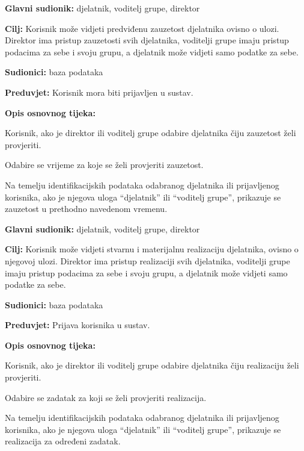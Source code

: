 			\begin{packed_item}
				\item \textbf{Glavni sudionik: } djelatnik, voditelj grupe, direktor
				\item  \textbf{Cilj:} Korisnik može vidjeti predviđenu zauzetost djelatnika ovisno o ulozi. Direktor ima pristup zauzetosti svih djelatnika, voditelji grupe imaju pristup podacima za sebe i svoju grupu, a djelatnik može vidjeti samo podatke za sebe.
				\item  \textbf{Sudionici:} baza podataka
				\item  \textbf{Preduvjet:} Korisnik mora biti prijavljen u sustav.
				\item  \textbf{Opis osnovnog tijeka:}
				\item[] \begin{packed_enum}
					\item Korisnik, ako je direktor ili voditelj grupe odabire djelatnika čiju zauzetost želi provjeriti. 
					\item Odabire se vrijeme za koje se želi provjeriti zauzetost. 
					\item Na temelju identifikacijskih podataka odabranog djelatnika ili prijavljenog korisnika, ako je njegova uloga “djelatnik” ili “voditelj grupe”, prikazuje se zauzetost u prethodno navedenom vremenu.
				\end{packed_enum}
			\end{packed_item}
			\noindent \underbar{\textbf{UC17 - Pregled realizacije djelatnika}}
			\begin{packed_item}
				\item \textbf{Glavni sudionik: } djelatnik, voditelj grupe, direktor
				\item  \textbf{Cilj:} Korisnik može vidjeti stvarnu i materijalnu realizaciju djelatnika, ovisno o njegovoj ulozi. Direktor ima pristup realizaciji svih djelatnika, voditelji grupe imaju pristup podacima za sebe i svoju grupu, a djelatnik može vidjeti samo podatke za sebe. 
				\item  \textbf{Sudionici:} baza podataka
				\item  \textbf{Preduvjet:} Prijava korisnika u sustav.
				\item  \textbf{Opis osnovnog tijeka:}
				\item[] \begin{packed_enum}
					\item Korisnik, ako je direktor ili voditelj grupe odabire djelatnika čiju realizaciju želi provjeriti. 
					\item Odabire se zadatak za koji se želi provjeriti realizacija. 
					\item Na temelju identifikacijskih podataka odabranog djelatnika ili  prijavljenog korisnika, ako je njegova uloga “djelatnik” ili “voditelj grupe”, prikazuje se realizacija za određeni zadatak.
				\end{packed_enum}
			\end{packed_item}

